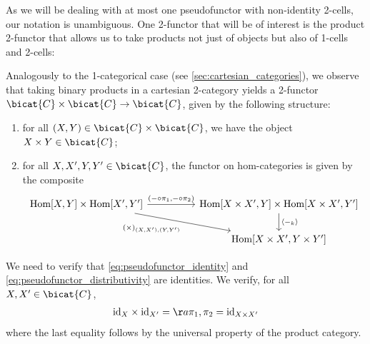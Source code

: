 As we will be dealing with at most one pseudofunctor with non-identity 2-cells, our
notation is unambiguous. One 2-functor that will be of interest is the product 2-functor
that allows us to take products not just of objects but also of 1-cells and 2-cells:

\begin{example}\label{ex:product_2functor}
  Analogously to the 1-categorical case (see \ref{sec:cartesian_categories}),
  we observe that taking binary products in a cartesian 2-category yields a
  2-functor $\bicat{C}\times\bicat{C}\to\bicat{C}$, given by the following
  structure:
  \begin{enumerate}
    \item for all $(X,Y)\in\bicat{C}\times\bicat{C}$, we have the object $X\times Y\in\bicat{C}$;
    \item for all $X,X',Y,Y'\in\bicat{C}$, the functor on hom-categories is given
      by the composite
      \begin{equation}
        \begin{tikzcd}
          {\text{Hom}[X,Y]\times\text{Hom}[X',Y']} && {\text{Hom}[X\times X',Y]\times\text{Hom}[X\times X',Y']} \\
                                                   && {\text{Hom}[X\times X',Y\times Y']}
                                                   \arrow["{\langle-_k\rangle}", from=1-3, to=2-3]
                                                   \arrow["{(-\circ\pi_1,-\circ\pi_2)}", from=1-1, to=1-3]
                                                   \arrow["{(\times)_{(X,X'),(Y,Y')}}"', from=1-1, to=2-3]
        \end{tikzcd}
      \end{equation}
  \end{enumerate}
  We need to verify that \ref{eq:pseudofunctor_identity} and \ref{eq:pseudofunctor_distributivity}
  are identities. We verify, for all $X,X'\in\bicat{C}$,
  \begin{align*}
    \text{id}_X\times \text{id}_{X'} = \aa{\pi_1,\pi_2} = \text{id}_{X\times X'}
  \end{align*}
  where the last equality follows by the universal property of the product category.

\end{example}
